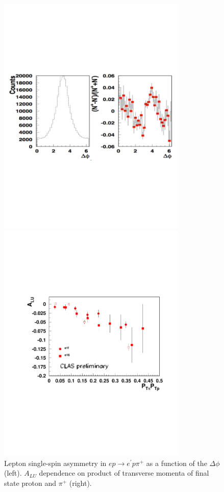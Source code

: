 \documentclass[11pt,a4paper]{article}
\begin{document}
\begin{figure}
\begin{minipage}{.6\textwidth}
\includegraphics[width=9cm]{plots/b2b-sinus.pdf}
\end{minipage}
\begin{minipage}{.6\textwidth}
\includegraphics[width=9cm]{plots/dr-b2b-pip-pt-bin36-z04-07-x01-06-pt0-065-min2.pdf}
\end{minipage}
   \caption{Lepton single-spin asymmetry in $ep\rightarrow e^\prime p\pi^+$ as a function of the $\Delta \phi$ (left). 
$A_{LU}$ dependence on product of transverse momenta of final state proton and $\pi^+$ (right).}
 \label{fig:b2bpt}
 \end{figure} 
\end{document}
